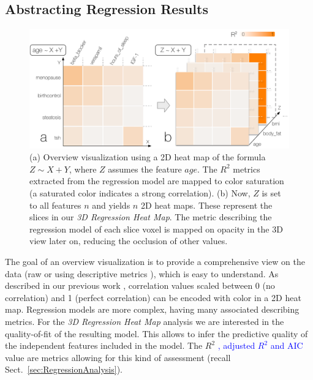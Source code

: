 \documentclass[journal]{style/vgtc} 			          %
\newcommand{\add}[1]{\textcolor{blue}{#1}}
\begin{document}
\subsection{Abstracting Regression Results}
\begin{figure}[htb]
 \centering
 \includegraphics[width=1.0\linewidth]{figures/heat_map}
 \caption{
 (a) Overview visualization using a 2D heat map of the formula $Z \sim X + Y$, where $Z$ assumes the feature $age$.
 The $R^2$ metrics extracted from the regression model are mapped to color saturation (a saturated color indicates a strong correlation).
 (b) Now, $Z$ is set to all features $n$ and yields $n$ 2D heat maps.
 These represent the slices in our \emph{3D Regression Heat Map}.
 The metric describing the regression model of each slice voxel is mapped on opacity in the 3D view later on, reducing the occlusion of other values.
 }
  \label{fig:Heat_Map}
\end{figure}
\noindent The goal of an overview visualization is to provide a comprehensive view on the data (raw or using descriptive metrics \cite{Bertini}), which is easy to understand.
As described in our previous work \cite{Klemm2014VIS}, correlation values scaled between 0 (no correlation) and 1 (perfect correlation) can be encoded with color in a 2D heat map.
Regression models are more complex, having many associated describing metrics.
For the \emph{3D Regression Heat Map} analysis we are interested in the quality-of-fit of the resulting model.
This allows to infer the predictive quality of the independent features included in the model.
The $R^2$ \add{, adjusted $R^2$ and AIC} value are metrics allowing for this kind of assessment (recall Sect.~\ref{sec:RegressionAnalysis}).
\end{document}
